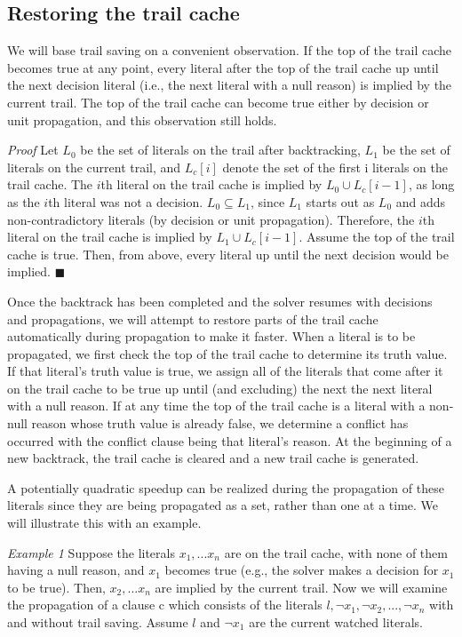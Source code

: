 \documentclass{article}
\begin{document}
\subsection{Restoring the trail cache}
We will base trail saving on a convenient observation. If the top of the trail cache becomes true at any point, every literal after the top of the trail cache up until the next decision literal (i.e., the next literal with a null reason) is implied by the current trail. The top of the trail cache can become true either by decision or unit propagation, and this observation still holds.\newline

\textit{Proof} Let $L_0$ be the set of literals on the trail after backtracking, $L_1$ be the set of literals on the current trail, and $L_c[i]$ denote the set of the first i literals on the trail cache. The $i$th literal on the trail cache is implied by $L_0 \cup L_c[i-1]$, as long as the $i$th literal was not a decision. $L_0 \subseteq L_1$, since $L_1$ starts out as $L_0$ and adds non-contradictory literals (by decision or unit propagation). Therefore, the $i$th literal on the trail cache is implied by $L_1 \cup L_c[i-1]$. Assume the top of the trail cache is true. Then, from above, every literal up until the next decision would be implied. $\blacksquare$\newline

Once the backtrack has been completed and the solver resumes with decisions and propagations, we will attempt to restore parts of the trail cache automatically during propagation to make it faster. When a literal is to be propagated, we first check the top of the trail cache to determine its truth value. If that literal's truth value is true, we assign all of the literals that come after it on the trail cache to be true up until (and excluding) the next the next literal with a null reason. If at any time the top of the trail cache is a literal with a non-null reason whose truth value is already false, we determine a conflict has occurred with the conflict clause being that literal's reason. At the beginning of a new backtrack, the trail cache is cleared and a new trail cache is generated.

A potentially quadratic speedup can be realized during the propagation of these literals since they are being propagated as a set, rather than one at a time. We will illustrate this with an example.\newline

\textit{Example 1} Suppose the literals $x_1, ... x_n$ are on the trail cache, with none of them having a null reason, and $x_1$ becomes true (e.g., the solver makes a decision for $x_1$ to be true). Then, $x_2, ... x_n$ are implied by the current trail. Now we will examine the propagation of a clause c which consists of the literals $l, \lnot x_1, \lnot x_2, ..., \lnot x_n$ with and without trail saving. Assume $l$ and $\lnot x_1$ are the current watched literals.
\end{document}
